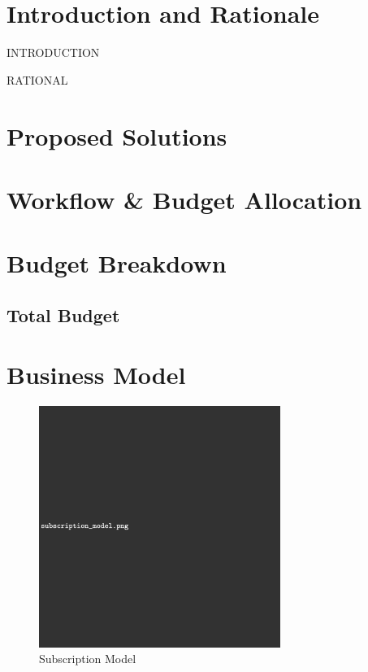 \documentclass[11pt]{article}
\begin{document}
\newpage
\clearpage
\vspace*{\fill}
\begin{center}
	\tableofcontents
\end{center}
\vspace*{\fill}
\clearpage

\section{Introduction and Rationale}

\vspace{0.3cm}

INTRODUCTION

\vspace{0.3cm}

RATIONAL

\section{Proposed Solutions }


\newpage

\section{Workflow \& Budget Allocation}


\section{Budget Breakdown}

\subsection*{Total Budget}

\section{Business Model}


\begin{figure}[h]
	\centering
	\includegraphics[width=0.7\textwidth]{subscription_model.png}
	\caption{Subscription Model}
	\label{fig:subscription_model}
\end{figure}
\end{document}
